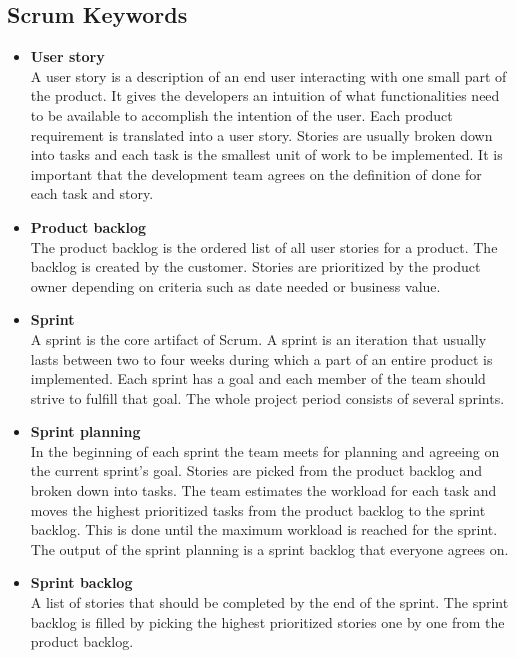 \subsection{Scrum Keywords}
\begin{itemize}
\item{\textbf{User story}}\\
A user story is a description of an end user interacting with one small part
of the product. It gives the developers an intuition of what functionalities need to be available
to accomplish the intention of the user.
Each product requirement is translated into a user story. Stories are usually
broken down into tasks and each task is the smallest unit of work to be implemented.
It is important that the development team agrees on the definition of done for each task and story.

\item{\textbf{Product backlog}}\\
The product backlog is the ordered list of all user stories for a product. The backlog
is created by the customer.
Stories are prioritized by the product owner depending on criteria such as date needed or business value.

\item{\textbf{Sprint}}\\
A sprint is the core artifact of Scrum. A sprint is an iteration that usually lasts between two to four weeks
during which a part of an entire product is implemented. Each sprint has a goal and each member of
the team should strive to fulfill that goal. The whole project period consists of several sprints.

\item{\textbf{Sprint planning}}\\
In the beginning of each sprint the team meets for planning and agreeing on the current sprint's goal.
Stories are picked from the product backlog and broken down into tasks. The team estimates the workload
for each task and moves the highest prioritized tasks from the product backlog to the
sprint backlog. This is done until the maximum workload is reached for the sprint. The output of the sprint planning
is a sprint backlog that everyone agrees on. 

\item{\textbf{Sprint backlog}}\\
A list of stories that should be completed by the end of the sprint. The sprint backlog is filled by picking the highest 
prioritized stories one by one from the product backlog. 


\end{itemize}
